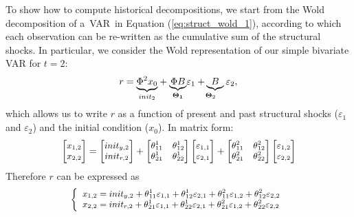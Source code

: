 \documentclass[10pt]{article}
\begin{document}
To show how to compute historical decompositions, we start from the Wold
decomposition of a\ VAR\ in Equation (\ref{eq:struct_wold_1}), according to
which each observation can be re-written as the cumulative sum of the
structural shocks. In particular, we consider the Wold representation of our
simple bivariate VAR for $t=2$:%
\begin{equation*}
r=\underset{init_{2}}{\underbrace{\Phi ^{2}x_{0}}}+\underset{\boldsymbol{%
\Theta }_{\boldsymbol{1}}}{\underbrace{\Phi B}}\varepsilon _{1}\underset{%
\boldsymbol{\Theta }_{2}}{+\underbrace{B}}\varepsilon _{2},
\end{equation*}%
which allows us to write $r$ as a function of present and past structural
shocks ($\varepsilon _{1}$ and $\varepsilon _{2}$) and the initial condition
($x_{0}$). In matrix form:%
\begin{equation*}
{\small
\begin{bmatrix}
x_{1,2} \\
x_{2,2}%
\end{bmatrix}%
=%
\begin{bmatrix}
init_{y,2} \\
init_{r,2}%
\end{bmatrix}%
+%
\begin{bmatrix}
\theta _{11}^{1} & \theta _{12}^{1} \\
\theta _{21}^{1} & \theta _{22}^{1}%
\end{bmatrix}%
\begin{bmatrix}
\varepsilon _{1,1} \\
\varepsilon _{2,1}%
\end{bmatrix}%
+%
\begin{bmatrix}
\theta _{11}^{2} & \theta _{12}^{2} \\
\theta _{21}^{2} & \theta _{22}^{2}%
\end{bmatrix}%
\begin{bmatrix}
\varepsilon _{1,2} \\
\varepsilon _{2,2}%
\end{bmatrix}%
}
\end{equation*}%
Therefore $r$ can be expressed as
\begin{equation*}
{\small \left\{
\begin{array}{l}
x_{1,2}=init_{y,2}+\theta _{11}^{1}\varepsilon _{1,1}+\theta
_{12}^{1}\varepsilon _{2,1}+\theta _{11}^{2}\varepsilon _{1,2}+\theta
_{12}^{2}\varepsilon _{2,2} \\
x_{2,2}=init_{r,2}+\theta _{21}^{1}\varepsilon _{1,1}+\theta
_{22}^{1}\varepsilon _{2,1}+\theta _{21}^{2}\varepsilon _{1,2}+\theta
_{22}^{2}\varepsilon _{2,2}%
\end{array}%
\right. }
\end{equation*}%
\end{document}

